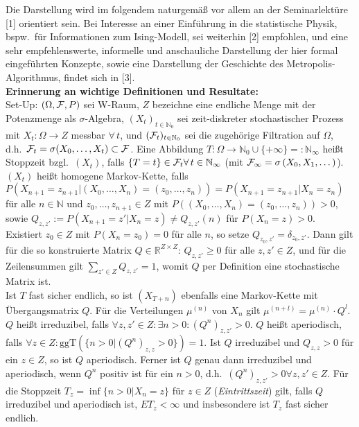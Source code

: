 \documentclass[twoside]{article}
\theoremstyle{definition}
\begin{document}
Die Darstellung wird im folgendem naturgemäß vor allem an der Seminarlektüre [1] orientiert sein. Bei Interesse an einer Einführung in die statistische Physik, bspw.\ für Informationen zum Ising-Modell, sei weiterhin [2] empfohlen, und eine sehr empfehlenswerte, informelle und anschauliche Darstellung der hier formal eingeführten Konzepte, sowie eine Darstellung der Geschichte des Metropolis-Algorithmus, findet sich in [3].\\

\textbf{Erinnerung an wichtige Definitionen und Resultate:}\\
Set-Up: $(\Omega, {\cal F}, P)$ sei W-Raum, $Z$ bezeichne eine endliche Menge mit der Potenzmenge als $\sigma$-Algebra, $(X_t)_{t \in \mathbb{N}_0}$ sei zeit-diskreter stochastischer Prozess mit $X_t:\Omega \to Z$ messbar $\forall \, t$, und $({\cal F}_t)_{t \in \mathbb{N}_0}$ sei die zugehörige Filtration auf $\Omega$, d.h.\ ${\cal F}_t = \sigma(X_0 , \dots , X_t) \subset {\cal F}$. Eine Abbildung $T: \Omega \to \mathbb{N}_0 \cup \{+\infty\} =:\mathbb{N}_{\infty}$ heißt Stoppzeit bzgl.\ $(X_t)$, falls $\{T=t\} \in {\cal F}_t \forall \, t \in \mathbb{N}_{\infty}$ (mit ${\cal F}_{\infty} = \sigma \left(X_0,X_1,\dots\right)$).\\
$(X_t)$ heißt homogene Markov-Kette, falls $P(X_{n+1}=z_{n+1}|(X_0, \dots , X_n) = (z_0, \dots, z_n)) = P(X_{n+1}=z_{n+1}|X_n =z_n)$ für alle $n \in \mathbb{N}$ und $z_0, \dots , z_{n+1} \in Z$ mit $P((X_0,\dots,X_n)=(z_0, \dots,z_n))>0$, sowie $Q_{z,z'} := P(X_{n+1}=z'|X_n=z) \neq Q_{z,z'}(n)$ für $P(X_n = z) > 0$. Existiert $z_0 \in Z$ mit  $P(X_n = z_0) = 0$ für alle $n$, so setze $Q_{z_0,z'} = \delta_{z_0,z'}$. Dann gilt für die so konstruierte Matrix $Q \in \mathbb{R}^{Z \times Z}$: $Q_{z,z'} \geq 0$ für alle $z,z' \in Z$, und für die Zeilensummen gilt $\sum_ {z' \in Z} Q_{z,z'} = 1$, womit $Q$ per Definition eine stochastische Matrix ist.\\
Ist $T$ fast sicher endlich, so ist $(X_{T+n})$ ebenfalls eine Markov-Kette mit Übergangsmatrix $Q$. Für die Verteilungen $\mu^{(n)}$ von $X_n$ gilt $\mu^{(n+l)}=\mu^{(n)} \cdot Q^l$. $Q$ heißt irreduzibel, falls $\forall z,z' \in Z : \exists n>0:(Q^n)_{z,z'}>0$. $Q$ heißt aperiodisch, falls $\forall z \in Z:  \text{ggT}(\{n>0|(Q^n)_{z,z}>0\})=1$. Ist $Q$ irreduzibel und $Q_{z,z}>0$ für ein $z \in Z$, so ist $Q$ aperiodisch. Ferner ist $Q$ genau dann irreduzibel und aperiodisch, wenn $Q^n$ positiv ist für ein $n>0$, d.h.\ $(Q^n)_{z,z'}>0 \forall z,z' \in Z$. Für die Stoppzeit $T_z = \inf \{n >0| X_n=z \}$ für $z \in Z$ (\textit{Eintrittszeit}) gilt, falls $Q$ irreduzibel und aperiodisch ist, $ET_z<\infty$ und insbesondere ist $T_z$ fast sicher endlich.\\
\end{document}
